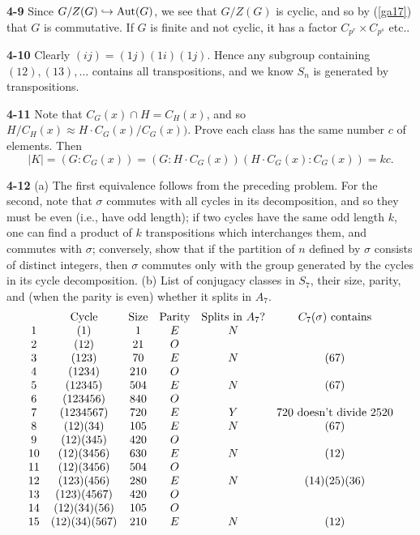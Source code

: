 \documentclass[a4paper,11pt,final]{memoir}%
\theoremstyle{nonumberplain}
\begin{document}
\bigskip\noindent\textbf{4-9}
Since $G/Z(G)\hookrightarrow\operatorname{Aut}(G)$, we see that $G/Z(G)$ is cyclic, and so
by (\ref{ga17}) that $G$ is commutative. If $G$ is finite and not cyclic, it
has a factor $C_{p^{r}}\times C_{p^{s}}$ etc..

\bigskip\noindent\textbf{4-10}
Clearly $(ij)=(1j)(1i)(1j)$. Hence any subgroup containing $(12),(13),\ldots$
contains all transpositions, and we know $S_{n}$ is generated by transpositions.

\bigskip\noindent\textbf{4-11}
Note that $C_{G}(x)\cap H=C_{H}(x)$, and so $H/C_{H}(x)\approx H\cdot
C_{G}(x)/C_{G}(x))$. Prove each class has the same number $c$ of elements.
Then
\[
|K|=(G:C_{G}(x))=(G:H\cdot C_{G}(x))(H\cdot C_{G}(x):C_{G}(x))=kc.
\]

\bigskip\noindent\textbf{4-12}
(a) The first equivalence follows from the preceding problem. For the second,
note that $\sigma$ commutes with all cycles in its decomposition, and so they
must be even (i.e., have odd length); if two cycles have the same odd length
$k$, one can find a product of $k$ transpositions which interchanges them, and
commutes with $\sigma$; conversely, show that if the partition of $n$ defined
by $\sigma$ consists of distinct integers, then $\sigma$ commutes only with
the group generated by the cycles in its cycle decomposition. (b) List of
conjugacy classes in $S_{7}$, their size, parity, and (when the parity is
even) whether it splits in $A_{7}$.
\[%
\begin{array}
[c]{cccccc}
& \text{Cycle} & \text{Size} & \text{Parity} & \text{Splits in }A_{7}? &
C_{7}(\sigma)\text{ contains}\\
1 & (1) & 1 & E & N & \\
2 & (12) & 21 & O &  & \\
3 & (123) & 70 & E & N & (67)\\
4 & (1234) & 210 & O &  & \\
5 & (12345) & 504 & E & N & (67)\\
6 & (123456) & 840 & O &  & \\
7 & (1234567) & 720 & E & Y & \text{720 doesn't divide 2520}\\
8 & (12)(34) & 105 & E & N & (67)\\
9 & (12)(345) & 420 & O &  & \\
10 & (12)(3456) & 630 & E & N & (12)\\
11 & (12)(3456) & 504 & O &  & \\
12 & (123)(456) & 280 & E & N & (14)(25)(36)\\
13 & (123)(4567) & 420 & O &  & \\
14 & (12)(34)(56) & 105 & O &  & \\
15 & (12)(34)(567) & 210 & E & N & (12)
\end{array}
\]
\end{document}
